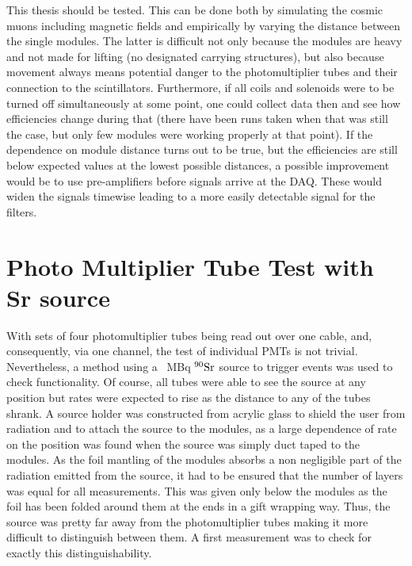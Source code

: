   This thesis should be tested. This can be done both by simulating the cosmic muons including magnetic fields and empirically by varying the distance between the single modules. The latter is difficult not only because the modules are heavy and not made for lifting (no designated carrying structures), but also because movement always means potential danger to the photomultiplier tubes and their connection to the scintillators.
  Furthermore, if all coils and solenoids were to be turned off simultaneously at some point, one could collect data then and see how efficiencies change during that (there have been runs taken when that was still the case, but only few modules were working properly at that point).
  If the dependence on module distance turns out to be true, but the efficiencies are still below expected values at the lowest possible distances, a possible improvement would be to use pre-amplifiers before signals arrive at the DAQ. These would widen the signals timewise leading to a more easily detectable signal for the filters.
  
  \section{Photo Multiplier Tube Test with Sr source}
  \label{ch:Analysis:sec:PhotoMultiplierTests}
  
  With sets of four photomultiplier tubes being read out over one cable, and, consequently, via one channel, the test of individual PMTs is not trivial. Nevertheless, a method using a \SI{}{\mega\becquerel} $\rm ^{90}Sr$ source to trigger events was used to check functionality. Of course, all tubes were able to see the source at any position but rates were expected to rise as the distance to any of the tubes shrank. A source holder was constructed from acrylic glass to shield the user from radiation and to attach the source to the modules, as a large dependence of rate on the position was found when the source was simply duct taped to the modules. As the foil mantling of the modules absorbs a non negligible part of the radiation emitted from the source, it had to be ensured that the number of layers was equal for all measurements. This was given only below the modules as the foil has been folded around them at the ends in a gift wrapping way. Thus, the source was pretty far away from the photomultiplier tubes making it more difficult to distinguish between them. A first measurement was to check for exactly this distinguishability.
  

